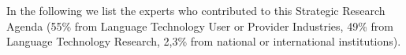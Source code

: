 \documentclass[10pt, plain]{../../metanetpaper}
\begin{document}

\clearpage

\appendix
{}





\clearpage



In the following we list the experts who contributed to this Strategic Research Agenda (55\% from Language Technology User or Provider Industries, 49\% from Language Technology Research, 2,3\% from national or international institutions).

\end{document}

